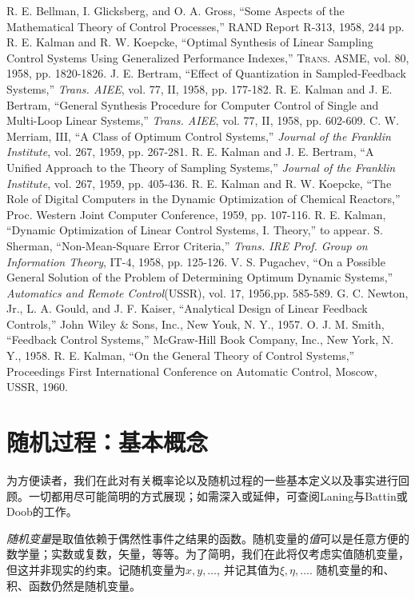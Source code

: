 \documentclass[UTF8,adobefonts]{ctexart}
\begin{document}
\begin{thebibliography}{0}
 R. E. Bellman, I. Glicksberg, and O. A. Gross, ``Some Aspects of the Mathematical Theory of Control Processes,'' RAND Report R-313, 1958, 244 pp.
 R. E. Kalman and R. W. Koepcke, ``Optimal Synthesis of Linear Sampling Control Systems Using Generalized Performance Indexes,'' \textsc{Trans. ASME}, vol. 80, 1958, pp. 1820-1826.
 J. E. Bertram, ``Effect of Quantization in Sampled-Feedback Systems,'' \textit{Trans. AIEE}, vol. 77, II, 1958, pp. 177-182.
 R. E. Kalman and J. E. Bertram, ``General Synthesis Procedure for Computer Control of Single and Multi-Loop Linear Systems,'' \textit{Trans. AIEE}, vol. 77, II, 1958, pp. 602-609.
 C. W. Merriam, III, ``A Class of Optimum Control Systems,'' \textit{Journal of the Franklin Institute}, vol. 267, 1959, pp. 267-281.
 R. E. Kalman and J. E. Bertram, ``A Unified Approach to the Theory of Sampling Systems,'' \textit{Journal of the Franklin Institute}, vol. 267, 1959, pp. 405-436.
 R. E. Kalman and R. W. Koepcke, ``The Role of Digital Computers in the Dynamic Optimization of Chemical Reactors,'' Proc. Western Joint Computer Conference, 1959, pp. 107-116.
 R. E. Kalman, ``Dynamic Optimization of Linear Control Systems, I. Theory,'' to appear.
 S. Sherman, ``Non-Mean-Square Error Criteria,'' \textit{Trans. IRE Prof. Group on Information Theory}, IT-4, 1958, pp. 125-126.
 V. S. Pugachev, ``On a Possible General Solution of the Problem of Determining Optimum Dynamic Systems,'' \textit{Automatics and Remote Control}(USSR), vol. 17, 1956,pp. 585-589.
 G. C. Newton, Jr., L. A. Gould, and J. F. Kaiser, ``Analytical Design of Linear Feedback Controls,'' John Wiley \& Sons, Inc., New Youk, N. Y., 1957.
 O. J. M. Smith, ``Feedback Control Systems,'' McGraw-Hill Book Company, Inc., New York, N. Y., 1958.
 R. E. Kalman, ``On the General Theory of Control Systems,'' Proceedings First International Conference on Automatic Control, Moscow, USSR, 1960.
\end{thebibliography}

\appendix
\section{随机过程：基本概念}
为方便读者，我们在此对有关概率论以及随机过程的一些基本定义以及事实进行回顾。一切都用尽可能简明的方式展现；如需深入或延伸，可查阅Laning与Battin或Doob的工作。

\emph{随机变量}是取值依赖于偶然性事件之结果的函数。随机变量的\emph{值}可以是任意方便的数学量；实数或复数，矢量，等等。为了简明，我们在此将仅考虑实值随机变量，但这并非现实的约束。记随机变量为$x,y,\dotsc$, 并记其值为$\xi,\eta,\dotsc$. 随机变量的和、积、函数仍然是随机变量。
\end{document}
